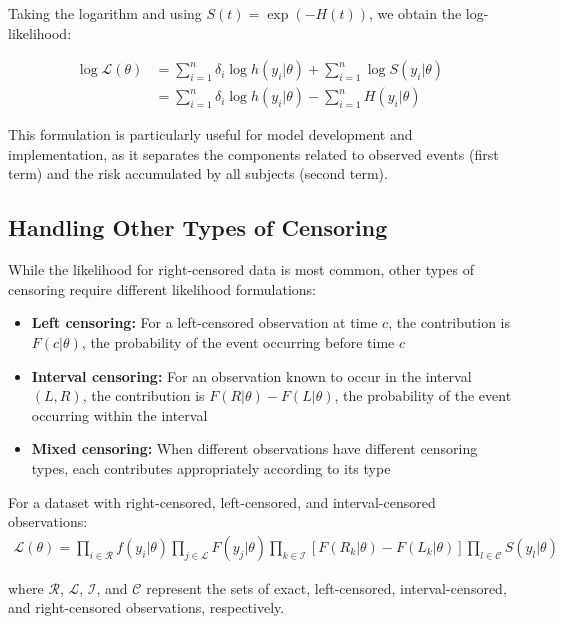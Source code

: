 Taking the logarithm and using $S(t) = \exp(-H(t))$, we obtain the log-likelihood:

\begin{equationbox}[title=Log-Likelihood for Survival Data]
\begin{align}
    \log\mathcal{L}(\theta) &= \sum_{i=1}^{n} \delta_i \log h(y_i|\theta) + \sum_{i=1}^{n} \log S(y_i|\theta) \\
    &= \sum_{i=1}^{n} \delta_i \log h(y_i|\theta) - \sum_{i=1}^{n} H(y_i|\theta)
\end{align}
\end{equationbox}

This formulation is particularly useful for model development and implementation, as it separates the components related to observed events (first term) and the risk accumulated by all subjects (second term).

\subsection{Handling Other Types of Censoring}

While the likelihood for right-censored data is most common, other types of censoring require different likelihood formulations:

\begin{itemize}
    \item \textbf{Left censoring:} For a left-censored observation at time $c$, the contribution is $F(c|\theta)$, the probability of the event occurring before time $c$

    \item \textbf{Interval censoring:} For an observation known to occur in the interval $(L, R)$, the contribution is $F(R|\theta) - F(L|\theta)$, the probability of the event occurring within the interval

    \item \textbf{Mixed censoring:} When different observations have different censoring types, each contributes appropriately according to its type
\end{itemize}

\begin{examplebox}[title=General Likelihood with Multiple Censoring Types]
For a dataset with right-censored, left-censored, and interval-censored observations:
\begin{align}
    \mathcal{L}(\theta) = \prod_{i \in \mathcal{R}} f(y_i|\theta) \prod_{j \in \mathcal{L}} F(y_j|\theta) \prod_{k \in \mathcal{I}} [F(R_k|\theta) - F(L_k|\theta)] \prod_{l \in \mathcal{C}} S(y_l|\theta)
\end{align}

where $\mathcal{R}$, $\mathcal{L}$, $\mathcal{I}$, and $\mathcal{C}$ represent the sets of exact, left-censored, interval-censored, and right-censored observations, respectively.
\end{examplebox}

